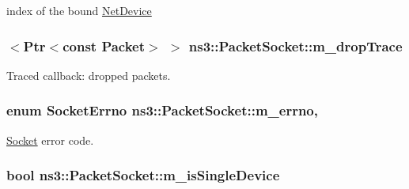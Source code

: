 index of the bound \hyperlink{classns3_1_1NetDevice}{Net\+Device} 

\subsubsection[{\texorpdfstring{m\+\_\+drop\+Trace}{m_dropTrace}}]{$<${\bf Ptr}$<$const {\bf Packet}$>$ $>$ ns3\+::\+Packet\+Socket\+::m\+\_\+drop\+Trace\hspace{0.3cm}{\ttfamily [private]}}\hypertarget{classns3_1_1PacketSocket_ae962e642085d93dadd3832a0355a10ad}{}\label{classns3_1_1PacketSocket_ae962e642085d93dadd3832a0355a10ad}


Traced callback\+: dropped packets. 

\subsubsection[{\texorpdfstring{m\+\_\+errno}{m_errno}}]{\setlength{\rightskip}{0pt plus 5cm}enum {\bf Socket\+Errno} ns3\+::\+Packet\+Socket\+::m\+\_\+errno\hspace{0.3cm}{\ttfamily [mutable]}, {\ttfamily [private]}}\hypertarget{classns3_1_1PacketSocket_ac1da4372f719a7fb20b8d7fa426f21cc}{}\label{classns3_1_1PacketSocket_ac1da4372f719a7fb20b8d7fa426f21cc}


\hyperlink{classns3_1_1Socket}{Socket} error code. 

\subsubsection[{\texorpdfstring{m\+\_\+is\+Single\+Device}{m_isSingleDevice}}]{\setlength{\rightskip}{0pt plus 5cm}bool ns3\+::\+Packet\+Socket\+::m\+\_\+is\+Single\+Device\hspace{0.3cm}{\ttfamily [private]}}\hypertarget{classns3_1_1PacketSocket_a8d45062d8bdc229074cfc45e4abb77ec}{}\label{classns3_1_1PacketSocket_a8d45062d8bdc229074cfc45e4abb77ec}


